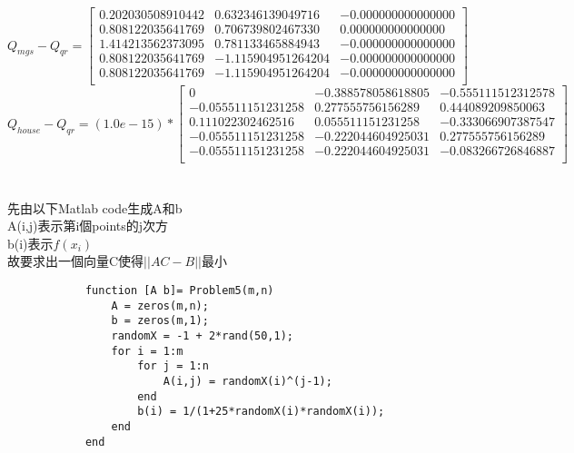 \documentclass{article}
\begin{document}
            \begin{equation}
                Q_{mgs} - Q_{qr} = \left[
                \begin{array}{ccc}
                    0.202030508910442 &  0.632346139049716 & -0.000000000000000\\
                    0.808122035641769 &  0.706739802467330 &  0.000000000000000\\
                    1.414213562373095 &  0.781133465884943 & -0.000000000000000\\
                    0.808122035641769 & -1.115904951264204 & -0.000000000000000\\
                    0.808122035641769 & -1.115904951264204 & -0.000000000000000\\
                \end{array}
                \right]
            \end{equation}
            \begin{equation}
                Q_{house} - Q_{qr} = (1.0e-15) * \left[
                \begin{array}{ccc}
                    0 & -0.388578058618805 & -0.555111512312578\\
                    -0.055511151231258 &  0.277555756156289 &  0.444089209850063\\
                     0.111022302462516 &  0.055511151231258 & -0.333066907387547\\
                    -0.055511151231258 & -0.222044604925031 &  0.277555756156289\\
                    -0.055511151231258 & -0.222044604925031 & -0.083266726846887\\
                \end{array}
                \right]
            \end{equation}
    \section{}
        先由以下Matlab code生成A和b\\
        A(i,j)表示第i個points的j次方\\
        b(i)表示$f(x_i)$\\
        故要求出一個向量C使得$||AC-B||$最小\\
        \lstset{language=Matlab}
        \begin{lstlisting}
            function [A b]= Problem5(m,n)
                A = zeros(m,n);
                b = zeros(m,1);
                randomX = -1 + 2*rand(50,1);
                for i = 1:m
                    for j = 1:n
                        A(i,j) = randomX(i)^(j-1);
                    end
                    b(i) = 1/(1+25*randomX(i)*randomX(i));
                end
            end
        \end{lstlisting} 
\end{document}
